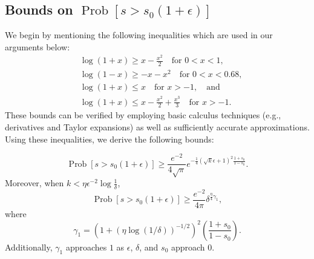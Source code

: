 \documentclass[twoside,11pt]{article}
\newcommand{\pP}[1]{\operatorname{Prob}\left[ #1 \right] }
\begin{document}
		
	
\subsection{Bounds on \texorpdfstring{$\pP{s>s_0(1+\epsilon)}$}{Prob[s>s0(1+epsilon)}}
We begin by mentioning the following inequalities which are used in our arguments below:
						\begin{align}
								& \log (1+x) \geq x-\frac{x^2}{2} \quad \text{for $0<x<1$},  \label{Bound:Ln_plus} \\	
								& \log (1-x) \geq -x -x^2 \quad \text{for $0 <x<0.68$,} \label{Bound:Ln_minus2}\\
								& \log(1+x) \leq x \quad \text{for $x>-1$},  \quad \text{and} \label{Bound:Ln_plus_upper}\\
								& \log(1+x) \leq x - \frac{x^2}{2} + \frac{x^3}{3} \quad \text{for $x>-1$}. \label{Bound:Ln_plus_upper2} 
						\end{align}
These bounds can be verified by employing basic calculus techniques (e.g., derivatives and Taylor expansions) as well as sufficiently accurate approximations.  Using these inequalities, we derive the following bounds:
		 
				\begin{lemma}	\label{Lemma:lower+} 
					\[ \pP{s>s_0(1+\epsilon)} \geq \frac{e^{-2}}{4 \sqrt{\pi}} e^{-\frac{1}{4}(\sqrt{k}\epsilon+1)^2 \frac{1+s_0}{1-s_0}}.\]   
										Moreover, when $k<\eta\epsilon^{-2}\log\frac{1}{\delta}$,
					\[ \pP{s>s_0(1+\epsilon)}\geq \frac{e^{-2}}{4\pi}\delta^{\frac{\eta}{4}\gamma_1},\]
					where
					$$
					\gamma_1=\left(1+(\eta\log(1/\delta))^{-1/2}\right)^2\left(\frac{1+s_0}{1-s_0}\right).
					$$
					Additionally, $\gamma_1$ approaches $1$ as $\epsilon$, $\delta$, and $s_0$ approach $0$.
				\end{lemma} 
				
\end{document}
